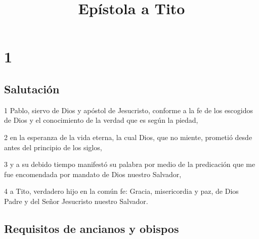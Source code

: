 
\title{Epístola a Tito}

\chapter{1}

\section*{Salutación}

\par 1 Pablo, siervo de Dios y apóstol de Jesucristo, conforme a la fe de los escogidos de Dios y el conocimiento de la verdad que es según la piedad,
\par 2 en la esperanza de la vida eterna, la cual Dios, que no miente, prometió desde antes del principio de los siglos,
\par 3 y a su debido tiempo manifestó su palabra por medio de la predicación que me fue encomendada por mandato de Dios nuestro Salvador,
\par 4 a Tito, verdadero hijo en la común fe: Gracia, misericordia y paz, de Dios Padre y del Señor Jesucristo nuestro Salvador.

\section*{Requisitos de ancianos y obispos}

